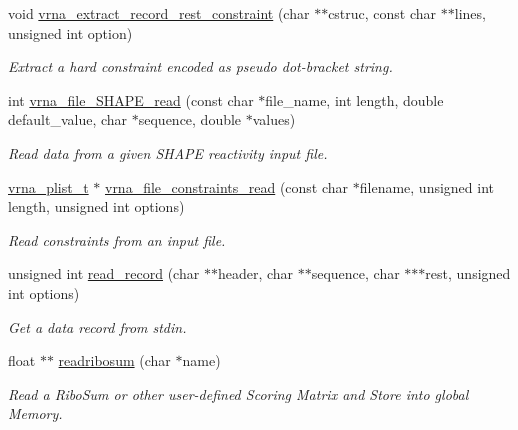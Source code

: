 \begin{DoxyCompactItemize}
void \hyperlink{group__file__utils_ga55a9ae6dfeecc1b3f0c2acf6fa796c15}{vrna\-\_\-extract\-\_\-record\-\_\-rest\-\_\-constraint} (char $\ast$$\ast$cstruc, const char $\ast$$\ast$lines, unsigned int option)
\begin{DoxyCompactList}\small\item\em Extract a hard constraint encoded as pseudo dot-\/bracket string. \end{DoxyCompactList}\item 
int \hyperlink{group__file__utils_ga646ebf45450a69a7f2533f9ecd283a32}{vrna\-\_\-file\-\_\-\-S\-H\-A\-P\-E\-\_\-read} (const char $\ast$file\-\_\-name, int length, double default\-\_\-value, char $\ast$sequence, double $\ast$values)
\begin{DoxyCompactList}\small\item\em Read data from a given S\-H\-A\-P\-E reactivity input file. \end{DoxyCompactList}\item 
\hyperlink{group__data__structures_ga8e4eb5e1bfc95776559575beb359af87}{vrna\-\_\-plist\-\_\-t} $\ast$ \hyperlink{group__file__utils_gae33323c53765ecbbc410d9de2d495432}{vrna\-\_\-file\-\_\-constraints\-\_\-read} (const char $\ast$filename, unsigned int length, unsigned int options)
\begin{DoxyCompactList}\small\item\em Read constraints from an input file. \end{DoxyCompactList}\item 
unsigned int \hyperlink{group__file__utils_gafd194a69af9d92b5b0412a7627ac1595}{read\-\_\-record} (char $\ast$$\ast$header, char $\ast$$\ast$sequence, char $\ast$$\ast$$\ast$rest, unsigned int options)
\begin{DoxyCompactList}\small\item\em Get a data record from stdin. \end{DoxyCompactList}\item 
\hypertarget{group__file__utils_ga5e125c9586fcd4e2e1559fe76f7289cc}{float $\ast$$\ast$ \hyperlink{group__file__utils_ga5e125c9586fcd4e2e1559fe76f7289cc}{readribosum} (char $\ast$name)}\label{group__file__utils_ga5e125c9586fcd4e2e1559fe76f7289cc}

\begin{DoxyCompactList}\small\item\em Read a Ribo\-Sum or other user-\/defined Scoring Matrix and Store into global Memory. \end{DoxyCompactList}\end{DoxyCompactItemize}


